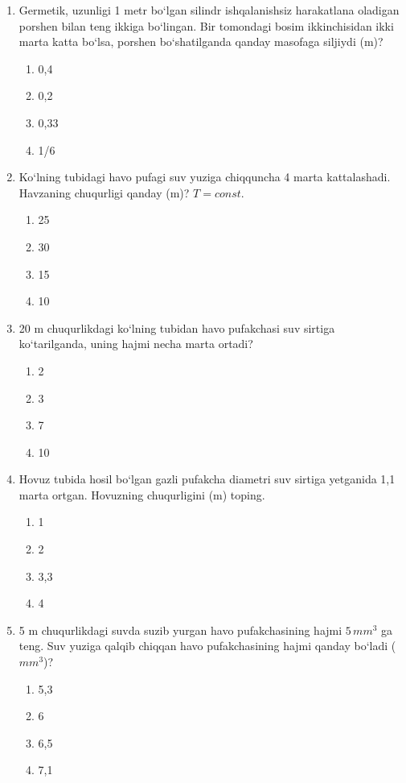\begin{enumerate}
\item Germetik, uzunligi 1 metr bo‘lgan silindr ishqalanishsiz harakatlana oladigan porshen bilan teng ikkiga bo‘lingan. Bir tomondagi bosim ikkinchisidan ikki marta katta bo‘lsa, porshen bo‘shatilganda qanday masofaga siljiydi (m)?
\begin{enumerate}[label=\Alph*)]
\item 0,4
\item 0,2
\item 0,33
\item 1/6
\end{enumerate}

\item Ko‘lning tubidagi havo pufagi suv yuziga chiqquncha 4 marta kattalashadi. Havzaning chuqurligi qanday (m)? $T = const$.
\begin{enumerate}[label=\Alph*)]
\item 25
\item 30
\item 15
\item 10
\end{enumerate}

\item 20 m chuqurlikdagi ko‘lning tubidan havo pufakchasi suv sirtiga ko‘tarilganda, uning hajmi necha marta ortadi?
\begin{enumerate}[label=\Alph*)]
\item 2
\item 3
\item 7
\item 10
\end{enumerate}

\item Hovuz tubida hosil bo‘lgan gazli pufakcha diametri suv sirtiga yetganida 1,1 marta ortgan. Hovuzning chuqurligini (m) toping.
\begin{enumerate}[label=\Alph*)]
\item 1
\item 2
\item 3,3
\item 4
\end{enumerate}

\item 5 m chuqurlikdagi suvda suzib yurgan havo pufakchasining hajmi $5 \, mm^3$ ga teng. Suv yuziga qalqib chiqqan havo pufakchasining hajmi qanday bo‘ladi ($mm^3$)?
\begin{enumerate}[label=\Alph*)]
\item 5,3
\item 6
\item 6,5
\item 7,1
\end{enumerate}


\end{enumerate}
